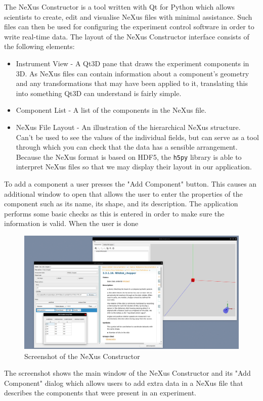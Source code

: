 
The NeXus Constructor is a tool written with Qt for Python which allows scientists to create, edit and visualise NeXus files with minimal assistance. Such files can then be used for configuring the experiment control software in order to write real-time data. The layout of the NeXus Constructor interface consists of the following elements:


\begin{itemize}
\item Instrument View - A Qt3D pane that draws the experiment components in 3D. As NeXus files can contain information about a component's geometry and any transformations that may have been applied to it, translating this into something Qt3D can understand is fairly simple.
\item Component List - A list of the components in the NeXus file.
\item NeXus File Layout - An illustration of the hierarchical NeXus structure. Can't be used to see the values of the individual fields, but can serve as a tool through which you can check that the data has a sensible arrangement. Because the NeXus format is based on HDF5, the \texttt{h5py} library is able to interpret NeXus files so that we may display their layout in our application.
\end{itemize}

To add a component a user presses the "Add Component" button. This causes an additional window to open that allows the user to enter the properties of the component such as its name, its shape, and its description. The application performs some basic checks as this is entered in order to make sure the information is valid. When the user is done 

\begin{figure}
\caption{Screenshot of the NeXus Constructor}
\includegraphics[width=\linewidth]{screenshot.png}
\end{figure}

The screenshot shows the main window of the NeXus Constructor and its "Add Component" dialog which allows users to add extra data in a NeXus file that describes the components that were present in an experiment.




